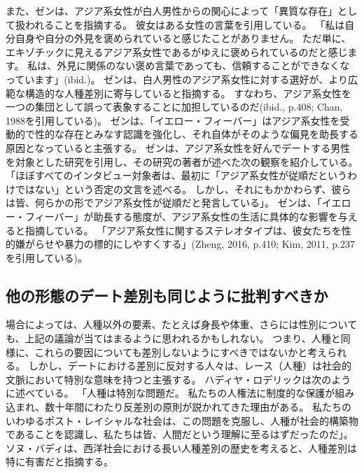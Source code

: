 \documentclass[paper=a4,book,openany]{jlreq}
\begin{document}
また、ゼンは、アジア系女性が白人男性からの関心によって「異質な存在」として扱われることを指摘する。
彼女はある女性の言葉を引用している。
「私は自分自身や自分の外見を褒められていると感じたことがありません。
ただ単に、エキゾチックに見えるアジア系女性であるがゆえに褒められているのだと感じます。
私は、外見に関係のない褒め言葉であっても、信頼することができなくなっています」(ibid.)。
ゼンは、白人男性のアジア系女性に対する選好が、より広範な構造的な人種差別に寄与していると指摘する。
すなわち、アジア系女性を一つの集団として誤って表象することに加担しているのだ(ibid., p.408; Chan, 1988を引用している)。
\nocite{chan88:_asian_americ_women}
ゼンは、「イエロー・フィーバー」はアジア系女性を受動的で性的な存在とみなす認識を強化し、それ自体がそのような偏見を助長する原因となっていると主張する。
ゼンは、アジア系女性を好んでデートする男性を対象とした研究を引用し、その研究の著者が述べた次の観察を紹介している。
「ほぼすべてのインタビュー対象者は、最初に「アジア系女性が従順だというわけではない」という否定の文言を述べる。
しかし、それにもかかわらず、彼らは皆、何らかの形でアジア系女性が従順だと発言している」\citep[p.410]{zheng16:_why_yellow_fever_isnt_flatt}。
ゼンは、「イエロー・フィーバー」が助長する態度が、アジア系女性の生活に具体的な影響を与えると指摘している。
「アジア系女性に関するステレオタイプは、彼女たちを性的嫌がらせや暴力の標的にしやすくする」(Zheng, 2016, p.410; Kim, 2011, p.237を引用している)。
\nocite{kim11:_asian_femal_caucas_male_coupl}

\subsection{他の形態のデート差別も同じように批判すべきか}

場合によっては、人種以外の要素、たとえば身長や体重、さらには性別についても、上記の議論が当てはまるように思われるかもしれない。
つまり、人種と同様に、これらの要因についても差別しないようにすべきではないかと考えられる。
しかし、デートにおける差別に反対する人々は、レース（人種）は社会的文脈において特別な意味を持つと主張する。
ハディヤ・ロデリックは次のように述べている。
「人種は特別な問題だ。
私たちの人権法に制度的な保護が組み込まれ、数十年間にわたり反差別の原則が説かれてきた理由がある。
私たちのいわゆるポスト・レイシャルな社会は、この問題を克服し、人種が社会的構築物であることを認識し、私たちは皆、人間だという理解に至るはずだったのだ」\citep{roderique17:_datin_black}。
ソヌ・バディは、西洋社会における長い人種差別の歴史を考えると、人種差別は特に有害だと指摘する。
\end{document}
